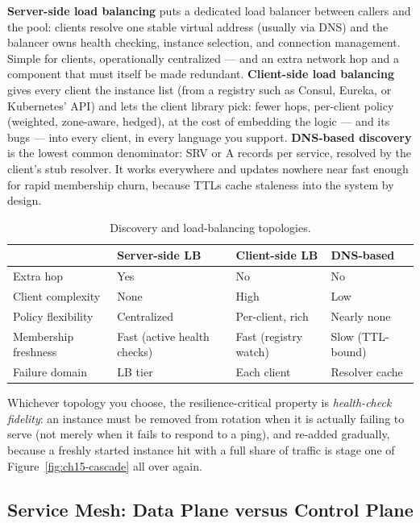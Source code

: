 \textbf{Server-side load balancing} puts a dedicated load balancer between
callers and the pool: clients resolve one stable virtual address (usually
via DNS) and the balancer owns health checking, instance selection, and
connection management. Simple for clients, operationally centralized --- and
an extra network hop and a component that must itself be made redundant.
\textbf{Client-side load balancing} gives every client the instance list
(from a registry such as Consul, Eureka, or Kubernetes' API) and lets the
client library pick: fewer hops, per-client policy (weighted, zone-aware,
hedged), at the cost of embedding the logic --- and its bugs --- into every
client, in every language you support. \textbf{DNS-based discovery} is the
lowest common denominator: SRV or A records per service, resolved by the
client's stub resolver. It works everywhere and updates nowhere near fast
enough for rapid membership churn, because TTLs cache staleness into the
system by design.

\begin{table}[h]
  \centering
  \small
  \begin{tabularx}{\textwidth}{l X X X}
    \toprule
    & \textbf{Server-side LB} & \textbf{Client-side LB} & \textbf{DNS-based} \\
    \midrule
    Extra hop & Yes & No & No \\
    Client complexity & None & High & Low \\
    Policy flexibility & Centralized & Per-client, rich & Nearly none \\
    Membership freshness & Fast (active health checks) & Fast (registry watch) & Slow (TTL-bound) \\
    Failure domain & LB tier & Each client & Resolver cache \\
    \bottomrule
  \end{tabularx}
  \caption{Discovery and load-balancing topologies.}
  \label{tab:ch15-discovery}
\end{table}

Whichever topology you choose, the resilience-critical property is
\emph{health-check fidelity}: an instance must be removed from rotation
when it is actually failing to serve (not merely when it fails to respond
to a ping), and re-added gradually, because a freshly started instance hit
with a full share of traffic is stage one of Figure~\ref{fig:ch15-cascade}
all over again.

\subsection{Service Mesh: Data Plane versus Control Plane}
\label{subsec:ch15-mesh}

